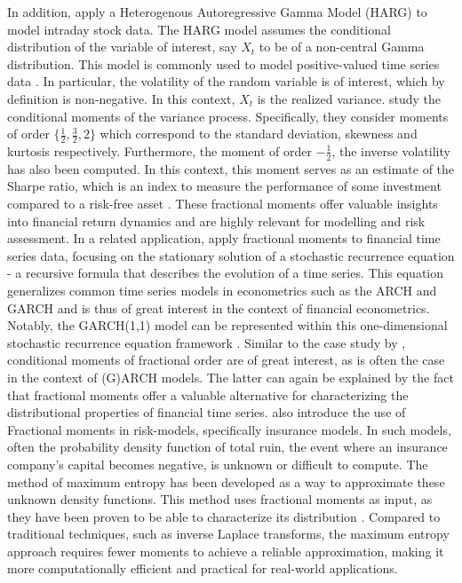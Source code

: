 \newline 
In addition, \cite{hansen2024} apply a Heterogenous Autoregressive Gamma Model (HARG) to model intraday stock data. The HARG model assumes the conditional distribution of the variable of interest, say \(X_t\) to be of a non-central Gamma distribution. This model is commonly used to model positive-valued time series data \cite{gourierroux2006}. In particular, the volatility of the random variable is of interest, which by definition is non-negative.
\newline
In this context, \(X_t\) is the realized variance. \cite{hansen2024} study the conditional moments of the variance process. Specifically, they consider moments of order \(\{\frac{1}{2}, \frac{3}{2}, 2\}\) which correspond to the standard deviation, skewness and kurtosis respectively. Furthermore, the moment of order \(-\frac{1}{2}\), the inverse volatility has also been computed. In this context, this moment serves as an estimate of the Sharpe ratio, which is an index to measure the performance of some investment compared to a risk-free asset \cite{sharpe1994}. These fractional moments offer valuable insights into financial return dynamics and are highly relevant for modelling and risk assessment. 
\newline
In a related application, \cite{Mikosc2013} apply fractional moments to financial time series data, focusing on the stationary solution of a stochastic recurrence equation - a recursive formula that describes the evolution of a time series. This equation generalizes common time series models in econometrics such as the ARCH and GARCH and is thus of great interest in the context of financial econometrics. Notably, the GARCH(1,1) model can be represented within this one-dimensional stochastic recurrence equation framework \cite{Mikosc2013}. 
\newline
Similar to the case study by \cite{hansen2024}, conditional moments of fractional order are of great interest, as is often the case in the context of (G)ARCH models. The latter can again be explained by the fact that fractional moments offer a valuable alternative for characterizing the distributional properties of financial time series.
\newline
\cite{gyzl2013} also introduce the use of Fractional moments in risk-models, specifically insurance models. In such models, often the probability density function of total ruin, the event where an insurance company's capital becomes negative, is unknown or difficult to compute. The method of maximum entropy has been developed as a way to approximate these unknown density functions. This method uses fractional moments as input, as they have been proven to be able to characterize its distribution \cite{lin1992}. Compared to traditional techniques, such as inverse Laplace transforms, the maximum entropy approach requires fewer moments to achieve a reliable approximation, making it more computationally efficient and practical for real-world applications. 
